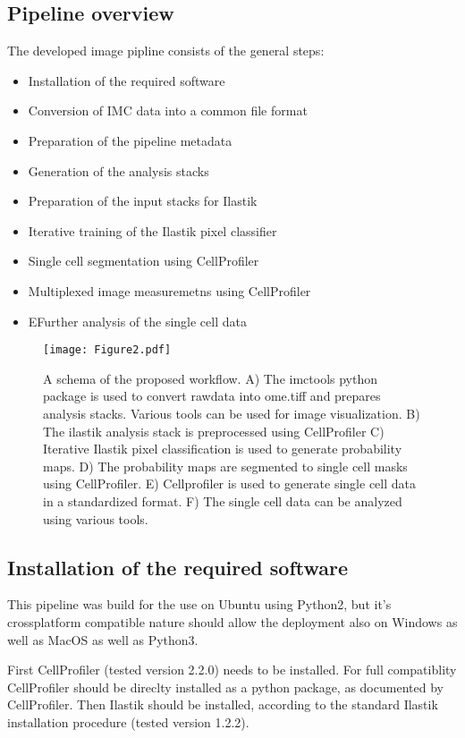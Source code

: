 \documentclass[a4paper]{article}
\begin{document}
\subsection{Pipeline overview}
The developed image pipline consists of the general steps:
\begin{itemize}
\item Installation of the required software
\item Conversion of IMC data into a common file format
\item Preparation of the pipeline metadata
\item Generation of the analysis stacks 
\item Preparation of the input stacks for Ilastik
\item Iterative training of the Ilastik pixel classifier
\item Single cell segmentation using CellProfiler
\item Multiplexed image measuremetns using CellProfiler
\item EFurther analysis of the single cell data
\end{itemize}

\begin{figure}[htb]
\centering
\texttt{[image: Figure2.pdf]}
\caption{
A schema of the proposed workflow. A) The imctools python package is
used to convert rawdata into ome.tiff and prepares analysis stacks. Various tools can be used for
image visualization. B) The ilastik analysis stack is preprocessed using CellProfiler C) Iterative Ilastik pixel classification is
used to generate probability maps. D) The probability maps are segmented to single cell masks using
CellProfiler. E) Cellprofiler is used to generate single cell data in a standardized format. F) The
single cell data can be analyzed using various tools.
\label{fig:pipeline}
}
\end{figure}

\subsection{Installation of the required software}
This pipeline was build for the use on Ubuntu using Python2, but it's crossplatform compatible nature should
allow the deployment also on Windows as well as MacOS as well as Python3.

First CellProfiler (tested version 2.2.0)  needs to be installed. For full compatiblity CellProfiler should be direclty
installed as a python package, as documented by CellProfiler. Then Ilastik should be installed,
according to the standard Ilastik installation procedure (tested version 1.2.2).
\end{document}
